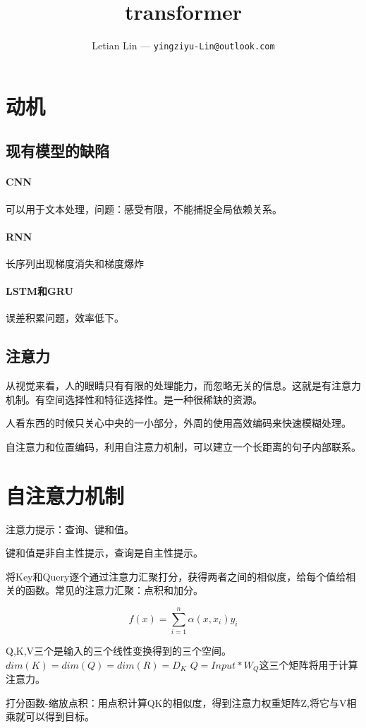 \documentclass[UTF8]{ctexart}
\title{
  transformer
}
\author{
	Letian Lin --- \texttt{yingziyu-Lin@outlook.com}
}
\begin{document}
\maketitle

\section{动机}
\subsection{现有模型的缺陷}
\paragraph{CNN}可以用于文本处理，问题：感受有限，不能捕捉全局依赖关系。
\paragraph{RNN}长序列出现梯度消失和梯度爆炸
\paragraph{LSTM和GRU}误差积累问题，效率低下。

\subsection{注意力}
从视觉来看，人的眼睛只有有限的处理能力，而忽略无关的信息。这就是有注意力机制。有空间选择性和特征选择性。是一种很稀缺的资源。

人看东西的时候只关心中央的一小部分，外周的使用高效编码来快速模糊处理。

自注意力和位置编码，利用自注意力机制，可以建立一个长距离的句子内部联系。

\section{自注意力机制}
注意力提示：查询、键和值。

键和值是非自主性提示，查询是自主性提示。

将Key和Query逐个通过注意力汇聚打分，获得两者之间的相似度，给每个值给相关的函数。常见的注意力汇聚：点积和加分。

$$f(x)=\sum^n_{i=1}\alpha(x,x_i)y_i$$

Q,K,V三个是输入的三个线性变换得到的三个空间。$dim( K )= dim( Q )= dim( R ) = D_K$ $Q=Input*W_Q$这三个矩阵将用于计算注意力。

打分函数-缩放点积：用点积计算QK的相似度，得到注意力权重矩阵Z,将它与V相乘就可以得到目标。
\end{document}
